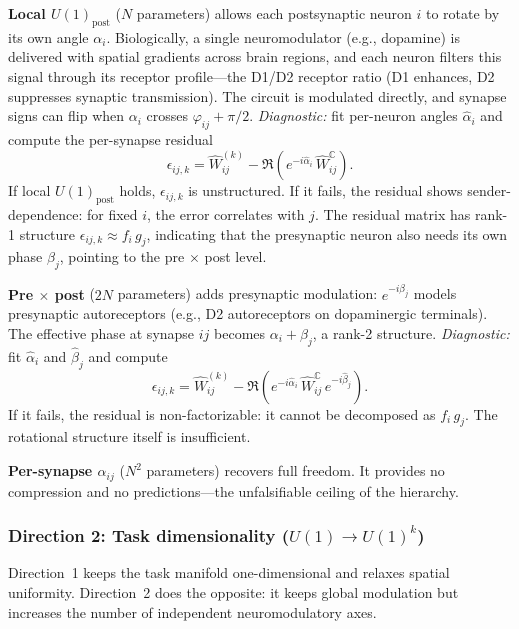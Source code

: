 \documentclass[11pt]{article}
\begin{document}
\textbf{Local $U(1)_{\text{post}}$} ($N$ parameters) allows each 
postsynaptic neuron $i$ to rotate by its own angle $\alpha_i$. 
Biologically, a single neuromodulator (e.g., dopamine) is delivered 
with spatial gradients across brain regions, and each neuron filters 
this signal through its receptor profile---the D1/D2 receptor ratio 
(D1 enhances, D2 suppresses synaptic transmission). The circuit is 
modulated directly, and synapse signs can flip when $\alpha_i$ 
crosses $\varphi_{ij} + \pi/2$. \emph{Diagnostic:} fit per-neuron 
angles $\hat{\alpha}_i$ and compute the per-synapse residual
\begin{equation}
\epsilon_{ij,k} = \hat{W}^{(k)}_{ij} 
- \Re\!\left(e^{-i\hat{\alpha}_i}\, \hat{W}^{\mathbb{C}}_{ij}\right).
\end{equation}
If local $U(1)_{\text{post}}$ holds, $\epsilon_{ij,k}$ is 
unstructured. If it fails, the residual shows sender-dependence: 
for fixed $i$, the error correlates with $j$. The residual matrix 
has rank-1 structure $\epsilon_{ij,k} \approx f_i\, g_j$, 
indicating that the presynaptic neuron also needs its own phase 
$\beta_j$, pointing to the pre $\times$ post level.

\textbf{Pre $\times$ post} ($2N$ parameters) adds presynaptic 
modulation: $e^{-i\beta_j}$ models presynaptic autoreceptors 
(e.g., D2 autoreceptors on dopaminergic terminals). The effective 
phase at synapse $ij$ becomes $\alpha_i + \beta_j$, a rank-2 
structure. \emph{Diagnostic:} fit $\hat{\alpha}_i$ and 
$\hat{\beta}_j$ and compute
\begin{equation}
\epsilon_{ij,k} = \hat{W}^{(k)}_{ij} 
- \Re\!\left(e^{-i\hat{\alpha}_i}\, 
\hat{W}^{\mathbb{C}}_{ij}\, e^{-i\hat{\beta}_j}\right).
\end{equation}
If it fails, the residual is non-factorizable: it cannot be 
decomposed as $f_i\, g_j$. The rotational structure itself is 
insufficient.

\textbf{Per-synapse $\alpha_{ij}$} ($N^2$ parameters) recovers 
full freedom. It provides no compression and no predictions---the 
unfalsifiable ceiling of the hierarchy.

\subsubsection{Direction 2: Task dimensionality ($U(1) \to U(1)^k$)}

Direction~1 keeps the task manifold one-dimensional and relaxes 
spatial uniformity. Direction~2 does the opposite: it keeps global 
modulation but increases the number of independent neuromodulatory 
axes.
\end{document}
